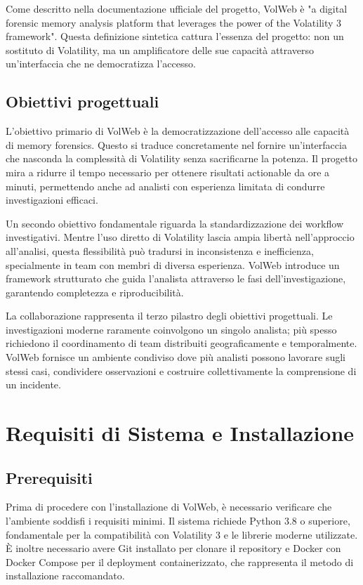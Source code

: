 Come descritto nella documentazione ufficiale del progetto, VolWeb è "a digital forensic memory analysis platform that leverages the power of the Volatility 3 framework". Questa definizione sintetica cattura l'essenza del progetto: non un sostituto di Volatility, ma un amplificatore delle sue capacità attraverso un'interfaccia che ne democratizza l'accesso.

\subsection{Obiettivi progettuali}

L'obiettivo primario di VolWeb è la democratizzazione dell'accesso alle capacità di memory forensics. Questo si traduce concretamente nel fornire un'interfaccia che nasconda la complessità di Volatility senza sacrificarne la potenza. Il progetto mira a ridurre il tempo necessario per ottenere risultati actionable da ore a minuti, permettendo anche ad analisti con esperienza limitata di condurre investigazioni efficaci.

Un secondo obiettivo fondamentale riguarda la standardizzazione dei workflow investigativi. Mentre l'uso diretto di Volatility lascia ampia libertà nell'approccio all'analisi, questa flessibilità può tradursi in inconsistenza e inefficienza, specialmente in team con membri di diversa esperienza. VolWeb introduce un framework strutturato che guida l'analista attraverso le fasi dell'investigazione, garantendo completezza e riproducibilità.

La collaborazione rappresenta il terzo pilastro degli obiettivi progettuali. Le investigazioni moderne raramente coinvolgono un singolo analista; più spesso richiedono il coordinamento di team distribuiti geograficamente e temporalmente. VolWeb fornisce un ambiente condiviso dove più analisti possono lavorare sugli stessi casi, condividere osservazioni e costruire collettivamente la comprensione di un incidente.

\section{Requisiti di Sistema e Installazione}

\subsection{Prerequisiti}

Prima di procedere con l'installazione di VolWeb, è necessario verificare che l'ambiente soddisfi i requisiti minimi. Il sistema richiede Python 3.8 o superiore, fondamentale per la compatibilità con Volatility 3 e le librerie moderne utilizzate. È inoltre necessario avere Git installato per clonare il repository e Docker con Docker Compose per il deployment containerizzato, che rappresenta il metodo di installazione raccomandato.

